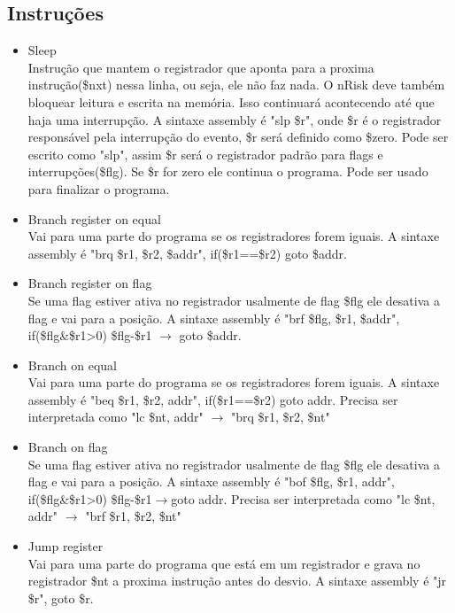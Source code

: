 \documentclass[a4paper, 10pt]{article}
\begin{document}
\subsection{Instruções}
\begin{itemize}
	\subsubsection{Controle de fluxo}
	\item Sleep \\
	Instrução que mantem o registrador que aponta para a proxima instrução(\$nxt) nessa linha, ou seja, ele não faz nada. O nRisk deve também bloquear leitura e escrita na memória. Isso continuará acontecendo até que haja uma interrupção. A sintaxe assembly é "slp \$r", onde \$r é o registrador responsável pela interrupção do evento, \$r será definido como \$zero. Pode ser escrito como "slp", assim \$r será o registrador padrão para flags e interrupções(\$flg). Se \$r for zero ele continua o programa. Pode ser usado para finalizar o programa.
	\item Branch register on equal\\
	Vai para uma parte do programa se os registradores forem iguais. A sintaxe assembly é "brq \$r1, \$r2, \$addr", if(\$r1==\$r2) goto \$addr.
	\item Branch register on flag\\
	Se uma flag estiver ativa no registrador usalmente de flag \$flg ele desativa a flag e vai para a posição. A sintaxe assembly é "brf \$flg, \$r1, \$addr", if(\$flg\&\$r1>0){ \$flg-\$r1 $\rightarrow$ goto \$addr}.
	\item Branch on equal\\
	Vai para uma parte do programa se os registradores forem iguais. A sintaxe assembly é "beq \$r1, \$r2, addr", if(\$r1==\$r2) goto addr. Precisa ser interpretada como "lc \$nt, addr" $\rightarrow$ "brq \$r1, \$r2, \$nt"
	\item Branch on flag\\
	Se uma flag estiver ativa no registrador usalmente de flag \$flg ele desativa a flag e vai para a posição. A sintaxe assembly é "bof \$flg, \$r1, addr", if(\$flg\&\$r1>0){ \$flg-\$r1$\rightarrow$goto addr}. Precisa ser interpretada como "lc \$nt, addr" $\rightarrow$ "brf \$r1, \$r2, \$nt"
	\item Jump register\\
	Vai para uma parte do programa que está em um registrador e grava no registrador \$nt a proxima instrução antes do desvio. A sintaxe assembly é "jr \$r", goto \$r.

\end{itemize}
\end{document}
